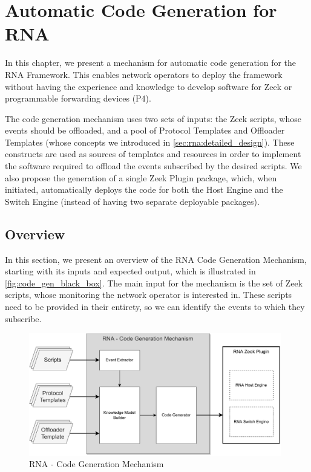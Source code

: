 \chapter{Automatic Code Generation for RNA}
\label{cap:code_gen}

In this chapter, we present a mechanism for automatic code generation for the RNA Framework. This enables network operators to deploy the framework without having the experience and knowledge to develop software for Zeek or programmable forwarding devices (P4).

The code generation mechanism uses two sets of inputs: the Zeek scripts, whose events should be offloaded, and a pool of Protocol Templates and Offloader Templates (whose concepts we introduced in \autoref{sec:rna:detailed_design}). These constructs are used as sources of templates and resources in order to implement the software required to offload the events subscribed by the desired scripts. We also propose the generation of a single Zeek Plugin package, which, when initiated, automatically deploys the code for both the Host Engine and the Switch Engine (instead of having two separate deployable packages).


\section{Overview}
\label{sec:code_gen:overview}

In this section, we present an overview of the RNA Code Generation Mechanism, starting with its inputs and expected output, which is illustrated in \autoref{fig:code_gen_black_box}. The main input for the mechanism is the set of Zeek scripts, whose monitoring the network operator is interested in. These scripts need to be provided in their entirety, so we can identify the events to which they subscribe.

\begin{figure}[htb]
    \caption{RNA - Code Generation Mechanism}
    \begin{center}
        \includegraphics[width=0.98\textwidth]{images/code_gen_mechanism.pdf}
    \end{center}
    \label{fig:code_gen_black_box}
\end{figure}

